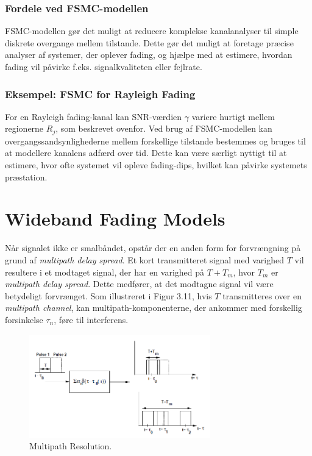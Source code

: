 \documentclass[a4paper,12pt]{book}
\begin{document}
	\subsubsection{Fordele ved FSMC-modellen}
	FSMC-modellen gør det muligt at reducere komplekse kanalanalyser til simple diskrete overgange mellem tilstande. Dette gør det muligt at foretage præcise analyser af systemer, der oplever fading, og hjælpe med at estimere, hvordan fading vil påvirke f.eks. signalkvaliteten eller fejlrate.
	
	\subsubsection{Eksempel: FSMC for Rayleigh Fading}
	For en Rayleigh fading-kanal kan SNR-værdien \( \gamma \) variere hurtigt mellem regionerne \( R_j \), som beskrevet ovenfor. Ved brug af FSMC-modellen kan overgangssandsynlighederne mellem forskellige tilstande bestemmes og bruges til at modellere kanalens adfærd over tid. Dette kan være særligt nyttigt til at estimere, hvor ofte systemet vil opleve fading-dips, hvilket kan påvirke systemets præstation.
	
	\section{Wideband Fading Models}
	Når signalet ikke er smalbåndet, opstår der en anden form for forvrængning på grund af \textit{multipath delay spread}. Et kort transmitteret signal med varighed $T$ vil resultere i et modtaget signal, der har en varighed på $T + T_m$, hvor $T_m$ er \textit{multipath delay spread}. Dette medfører, at det modtagne signal vil være betydeligt forvrænget. Som illustreret i Figur 3.11, hvis $T$ transmitteres over en \textit{multipath channel}, kan multipath-komponenterne, der ankommer med forskellig forsinkelse $\tau_n$, føre til interferens.
	
	\begin{figure}[h]
		\centering
		\includegraphics[width=0.7\textwidth]{fig/fig26.png}
		\caption{Multipath Resolution.}
	\end{figure}
	
\end{document}
